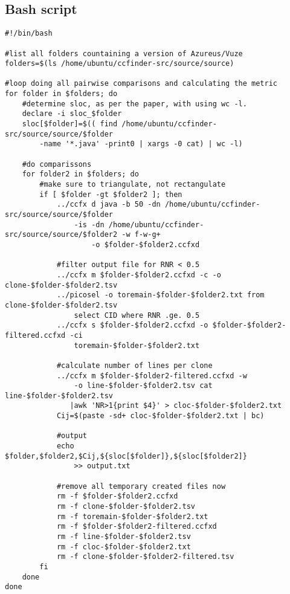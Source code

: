 \documentclass[a4paper,twoside, twocolumn, 11pt]{article}
\numberwithin{equation}{section}
\begin{document}
\onecolumn
\pagestyle{empty} %
\begin{appendices}
\section{Bash script}\label{script}
\scriptsize
\begin{verbatim}
#!/bin/bash

#list all folders countaining a version of Azureus/Vuze
folders=$(ls /home/ubuntu/ccfinder-src/source/source)

#loop doing all pairwise comparisons and calculating the metric
for folder in $folders; do
    #determine sloc, as per the paper, with using wc -l.
    declare -i sloc_$folder
    sloc[$folder]=$(( find /home/ubuntu/ccfinder-src/source/source/$folder 
        -name '*.java' -print0 | xargs -0 cat) | wc -l)

    #do comparissons
    for folder2 in $folders; do    
        #make sure to triangulate, not rectangulate
        if [ $folder -gt $folder2 ]; then     
            ../ccfx d java -b 50 -dn /home/ubuntu/ccfinder-src/source/source/$folder 
                -is -dn /home/ubuntu/ccfinder-src/source/source/$folder2 -w f-w-g+ 
                    -o $folder-$folder2.ccfxd 

            #filter output file for RNR < 0.5
            ../ccfx m $folder-$folder2.ccfxd -c -o clone-$folder-$folder2.tsv            
            ../picosel -o toremain-$folder-$folder2.txt from clone-$folder-$folder2.tsv 
                select CID where RNR .ge. 0.5
            ../ccfx s $folder-$folder2.ccfxd -o $folder-$folder2-filtered.ccfxd -ci 
                toremain-$folder-$folder2.txt

            #calculate number of lines per clone
            ../ccfx m $folder-$folder2-filtered.ccfxd -w 
                -o line-$folder-$folder2.tsv cat line-$folder-$folder2.tsv
               |awk 'NR>1{print $4}' > cloc-$folder-$folder2.txt
            Cij=$(paste -sd+ cloc-$folder-$folder2.txt | bc)

            #output
            echo $folder,$folder2,$Cij,${sloc[$folder]},${sloc[$folder2]} 
                >> output.txt

            #remove all temporary created files now
            rm -f $folder-$folder2.ccfxd
            rm -f clone-$folder-$folder2.tsv
            rm -f toremain-$folder-$folder2.txt 
            rm -f $folder-$folder2-filtered.ccfxd
            rm -f line-$folder-$folder2.tsv
            rm -f cloc-$folder-$folder2.txt
            rm -f clone-$folder-$folder2-filtered.tsv
        fi
    done
done



\end{verbatim}
\end{appendices}
\end{document}
